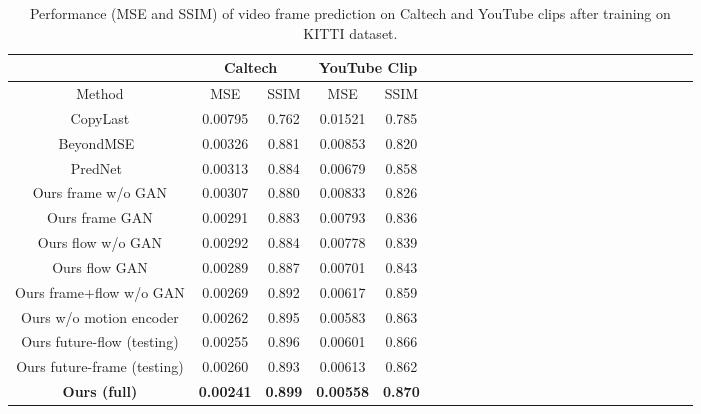 \documentclass[10pt,twocolumn,letterpaper]{article}
\begin{document}
	\begin{table}[!tp]
		\centering\renewcommand{}\footnotesize
		\caption{Performance (MSE and SSIM) of video frame prediction on Caltech and YouTube clips after training on KITTI dataset.}\label{tab:kitti}
		\begin{tabular}{c|c|c|c|ccccccccccccccccccp{6em}p{5em}}
			\toprule
			& \multicolumn{2}{|c|}{Caltech} &\multicolumn{2}{|c}{YouTube Clip}\\
			\hline
			Method & MSE & SSIM  & MSE & SSIM\\
			\hline
			CopyLast & 0.00795 & 0.762 & 0.01521 & 0.785\\
			\hline
			BeyondMSE~\cite{mathieu2015deep} & {0.00326} & {0.881} & {0.00853} & {0.820}\\
			\hline
			PredNet~\cite{lotter2016deep} & 0.00313 & 0.884 & 0.00679 & 0.858\\
			\hline
			{Ours frame w/o GAN} & {0.00307} & {0.880} & {0.00833} & {0.826}\\
			{Ours frame GAN} & {0.00291} & {0.883} & {0.00793} & {0.836}\\
			{Ours flow w/o GAN} & {0.00292} & {0.884} & {0.00778} & {0.839}\\
			{Ours flow GAN} & {0.00289} & {0.887} & {0.00701} & {0.843}\\
			{Ours frame+flow w/o GAN} & {0.00269} & {0.892} & {0.00617} & {0.859}\\
			{Ours w/o motion encoder} & {0.00262} & {0.895} & {0.00583} & {0.863}\\
			\hline
			{Ours future-flow (testing)} & {0.00255} & {0.896} & {0.00601} & {0.866}\\
			{Ours future-frame (testing)} & {0.00260} & {0.893} & {0.00613} & {0.862}\\
			\hline
			\textbf{Ours (full)} & \textbf{0.00241} & \textbf{0.899} & \textbf{0.00558} & \textbf{0.870}\\
			\bottomrule
		\end{tabular}%
		\vspace{-3mm}
	\end{table}%
	
\end{document}
